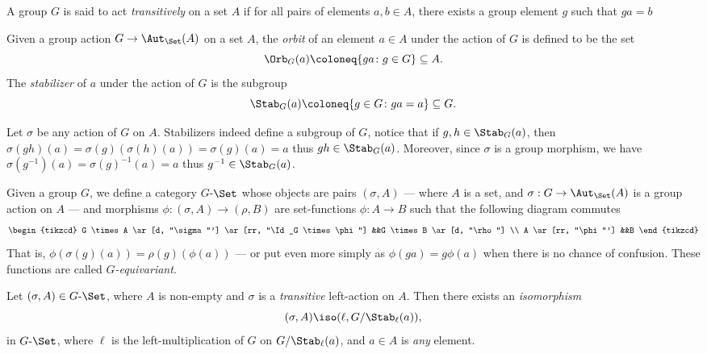 \begin{definition}
\label{def:transitive-action}
A group \(G\) is said to act \emph{transitively} on a set \(A\) if for all pairs
of elements \(a, b \in A\), there exists a group element \(g\) such that
\(g a = b\)
\end{definition}

\begin{definition}
\label{def:orbit-and-stabilizer}
Given a group action \(G \to \Aut_{\Set}(A)\) on a set \(A\), the \emph{orbit}
of an element \(a \in A\) under the action of \(G\) is defined to be the
set
\[
\Orb_G(a) \coloneq \{g a \colon g \in G\} \subseteq A.
\]
The \emph{stabilizer} of \(a\) under the action of \(G\) is the subgroup
\[
\Stab_G(a) \coloneq \{g \in G \colon g a = a\} \subseteq G.
\]
\end{definition}

Let \(\sigma\) be any action of \(G\) on \(A\). Stabilizers indeed define a
subgroup of \(G\), notice that if \(g, h \in \Stab_G(a)\), then
\(\sigma(g h)(a) = \sigma(g)(\sigma(h)(a)) = \sigma(g)(a) = a\) thus
\(g h \in \Stab_G(a)\). Moreover, since \(\sigma\) is a group morphism, we have
\(\sigma(g^{-1})(a) = \sigma(g)^{-1}(a) = a\) thus \(g^{-1} \in
\Stab_G(a)\).

\begin{definition}
\label{def:G-set-category}
Given a group \(G\), we define a category \(G\)-\(\Set\) whose objects are pairs
\((\sigma, A)\) --- where \(A\) is a set, and \(\sigma: G \to \Aut_{\Set}(A)\)
is a group action on \(A\) --- and morphisms \(\phi: (\sigma, A) \to (\rho, B)\)
are set-functions \(\phi: A \to B\) such that the following diagram commutes
\[
\begin{tikzcd}
G \times A \ar[d, "\sigma"'] \ar[rr, "\Id_G \times \phi"]
&&G \times B \ar[d, "\rho"] \\
A \ar[rr, "\phi"'] &&B
\end{tikzcd}
\]
That is, \(\phi(\sigma(g)(a)) = \rho(g)(\phi(a))\) --- or put even more simply
as \(\phi(g a) = g \phi(a)\) when there is no chance of confusion. These
functions are called \emph{\(G\)-equivariant}.
\end{definition}

\begin{proposition}
\label{prop:transitive-G-set-iso-left-mul-G/Stab}
Let \((\sigma, A) \in G\text{-}\Set\), where \(A\) is non-empty and \(\sigma\)
is a \emph{transitive} left-action on \(A\). Then there exists an
\emph{isomorphism}
\[
(\sigma, A) \iso (\ell, G/\Stab_{\ell}(a)),
\]
in \(G\text{-}\Set\), where \(\ell\) is the left-multiplication of \(G\)
on \(G/\Stab_{\ell}(a)\), and \(a \in A\) is \emph{any} element.
\end{proposition}

